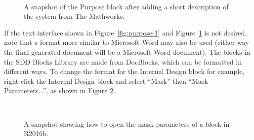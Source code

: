 \documentclass{mcscert}
\newcommand{\sddblks}{SDD Blocks Library}
\begin{document}
\begin{figure}
	\caption{A snapshot of the Purpose block after adding a short description of the system from The Mathworks.}
	\centering
	\label{fig:purpose-2}
	\\
\end{figure}

If the text interface shown in Figure~\ref{fig:purpose-1} and Figure~\ref{fig:purpose-2} is not desired, note that a format more similar to Microsoft Word may also be used (either way the final generated document will be a Microsoft Word document). 
The blocks in the \sddblks{} are made from \textsf{DocBlocks}, which can be formatted in different ways. 
To change the format for the Internal Design block for example, right-click the Internal Design block and select ``Mask'' then ``Mask Parameters...'', as shown in Figure \ref{fig:open-mask-param}.

\begin{figure}
	\caption{A snapshot showing how to open the mask parameters of a block in	\matlab{} R2016b.}
	\centering
	\label{fig:open-mask-param}
	\\
\end{figure}
\end{document}
